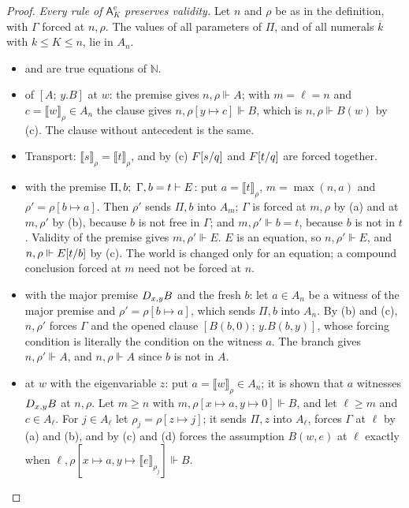 \begin{proof}
\emph{Every rule of $\mathsf{A}^{\mathrm e}_{K}$ preserves validity.}  Let
$n$ and $\rho$ be as in the definition, with $\Gamma$ forced at $n,\rho$.
The values of all parameters of $\Pi$, and of all numerals $\overline{k}$
with $k\le K\le n$, lie in $A_n$.
\begin{itemize}
\item {} and  are true equations of $\mathbb{N}$.
\item {} of $[A;\,y.B]$ at $w$: the premise gives $n,\rho\Vdash A$;
 with $m=\ell=n$ and $c=\llbracket w\rrbracket_\rho\in A_n$ the clause gives
 $n,\rho[y\mapsto c]\Vdash B$, which is $n,\rho\Vdash B(w)$ by (c).  The
 clause without antecedent is the same.
\item Transport: $\llbracket s\rrbracket_\rho=\llbracket t\rrbracket_\rho$, and
 by (c) $F[s/q]$ and $F[t/q]$ are forced together.
\item {} with the premise $\Pi,b;\ \Gamma,b=t\proves E$: put
 $a=\llbracket t\rrbracket_\rho$, $m=\max(n,a)$ and $\rho'=\rho[b\mapsto a]$.
 Then $\rho'$ sends $\Pi,b$ into $A_m$; $\Gamma$ is forced at $m,\rho$ by (a)
 and at $m,\rho'$ by (b), because $b$ is not free in $\Gamma$; and
 $m,\rho'\Vdash b=t$, because $b$ is not in $t$.  Validity of the premise
 gives $m,\rho'\Vdash E$.  $E$ is an equation, so $n,\rho'\Vdash E$, and
 $n,\rho\Vdash E[t/b]$ by (c).  The world is changed only for an
 equation; a compound conclusion forced at $m$ need not be forced at $n$.
\item {} with the major premise $D_{x,y}B$ and the fresh $b$:
 let $a\in A_n$ be a witness of the major premise and
 $\rho'=\rho[b\mapsto a]$, which sends $\Pi,b$ into $A_n$.  By (b) and (c),
 $n,\rho'$ forces $\Gamma$ and the opened clause $[B(b,0);\,y.B(b,y)]$, whose
 forcing condition is literally the condition on the witness $a$.  The branch
 gives $n,\rho'\Vdash A$, and $n,\rho\Vdash A$ since $b$ is not in $A$.
\item {} at $w$ with the eigenvariable $z$: put
 $a=\llbracket w\rrbracket_\rho\in A_n$; it is shown that $a$ witnesses
 $D_{x,y}B$ at $n,\rho$.  Let $m\ge n$ with
 $m,\rho[x\mapsto a,y\mapsto 0]\Vdash B$, and let $\ell\ge m$ and
 $c\in A_\ell$.  For $j\in A_\ell$ let $\rho_j=\rho[z\mapsto j]$; it sends
 $\Pi,z$ into $A_\ell$, forces $\Gamma$ at $\ell$ by (a) and (b), and by (c)
 and (d) forces the assumption $B(w,e)$ at $\ell$ exactly when
 $\ell,\rho[x\mapsto a,y\mapsto\llbracket e\rrbracket_{\rho_j}]\Vdash B$.

\end{itemize}
\end{proof}
